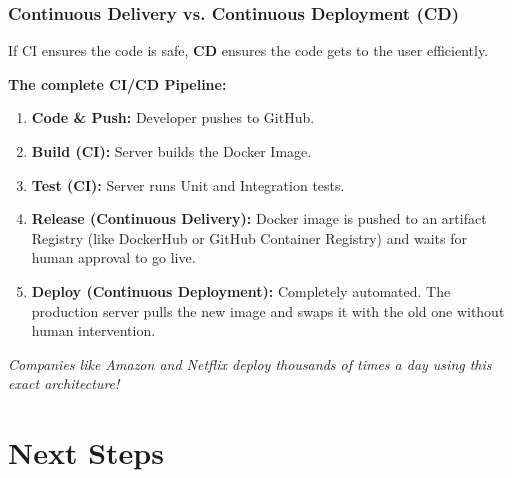 \documentclass[xcolor=table]{beamer}
\begin{document}
\begin{frame}
    \frametitle{Continuous Delivery vs. Continuous Deployment (CD)}
    If CI ensures the code is safe, \textbf{CD} ensures the code gets to the user efficiently.
    
    \vspace{0.3cm}
    \textbf{The complete CI/CD Pipeline:}
    \begin{enumerate}
        \item \textbf{Code \& Push:} Developer pushes to GitHub.
        \item \textbf{Build (CI):} Server builds the Docker Image.
        \item \textbf{Test (CI):} Server runs Unit and Integration tests.
        \item \textbf{Release (Continuous Delivery):} Docker image is pushed to an artifact Registry (like DockerHub or GitHub Container Registry) and waits for human approval to go live.
        \item \textbf{Deploy (Continuous Deployment):} Completely automated. The production server pulls the new image and swaps it with the old one without human intervention.
    \end{enumerate}
    \textit{Companies like Amazon and Netflix deploy thousands of times a day using this exact architecture!}
\end{frame}


\section{Next Steps}

    
\end{document}
